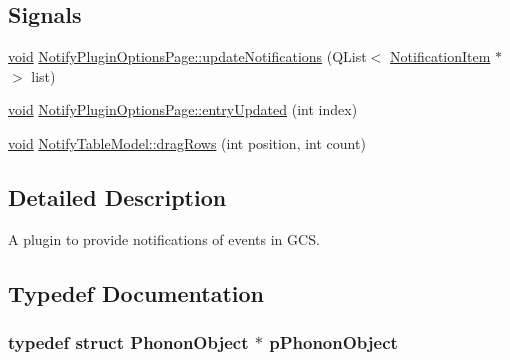 \subsection*{\-Signals}
\begin{DoxyCompactItemize}
\item 
\hyperlink{group___u_a_v_objects_plugin_ga444cf2ff3f0ecbe028adce838d373f5c}{void} \hyperlink{group___notify_plugin_gadbd273176d3047b997383d3791fcf3aa}{\-Notify\-Plugin\-Options\-Page\-::update\-Notifications} (\-Q\-List$<$ \hyperlink{class_notification_item}{\-Notification\-Item} $\ast$ $>$ list)
\item 
\hyperlink{group___u_a_v_objects_plugin_ga444cf2ff3f0ecbe028adce838d373f5c}{void} \hyperlink{group___notify_plugin_gacfc979fcc446bc951c04ba8741231190}{\-Notify\-Plugin\-Options\-Page\-::entry\-Updated} (int index)
\item 
\hyperlink{group___u_a_v_objects_plugin_ga444cf2ff3f0ecbe028adce838d373f5c}{void} \hyperlink{group___notify_plugin_ga87b02089128dd9f2eddbd2e70040201f}{\-Notify\-Table\-Model\-::drag\-Rows} (int position, int count)
\end{DoxyCompactItemize}


\subsection{\-Detailed \-Description}
\-A plugin to provide notifications of events in \-G\-C\-S. 

\subsection{\-Typedef \-Documentation}
\hypertarget{group___notify_plugin_ga29339e638aa7c15d99ff655f2f0e2c89}{
\subsubsection[{p\-Phonon\-Object}]{\setlength{\rightskip}{0pt plus 5cm}typedef  struct {\bf \-Phonon\-Object} $\ast$ {\bf p\-Phonon\-Object}}}\label{group___notify_plugin_ga29339e638aa7c15d99ff655f2f0e2c89}


